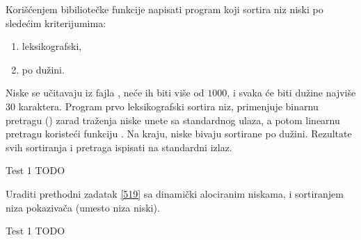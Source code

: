 \begin{Exercise}[label=519]
   Korišćenjem bibiliotečke funkcije  napisati program
   koji sortira niz niski po sledećim kriterijumima:
   \begin{enumerate}
   \item leksikografski,
   \item po dužini.
   \end{enumerate}
   Niske se učitavaju iz fajla , neće ih biti više od
   $1000$, i svaka će biti dužine najviše $30$ karaktera. Program prvo
   leksikografski sortira niz, primenjuje binarnu pretragu
   () zarad traženja niske unete sa standardnog ulaza,
   a potom linearnu pretragu koristeći funkciju . Na
   kraju, niske bivaju sortirane po dužini. Rezultate svih sortiranja
   i pretraga ispisati na standardni izlaz.
   
\begin{miditest}
\begin{test}{Test 1}
TODO
\end{test}
\end{miditest}
  
\end{Exercise}

\begin{Exercise}[label=520]
  Uraditi prethodni zadatak \ref{519} sa dinamički alociranim niskama,
  i sortiranjem niza pokazivača (umesto niza niski).
  
\begin{miditest}
\begin{test}{Test 1}
TODO
\end{test}
\end{miditest}
  
\end{Exercise}


